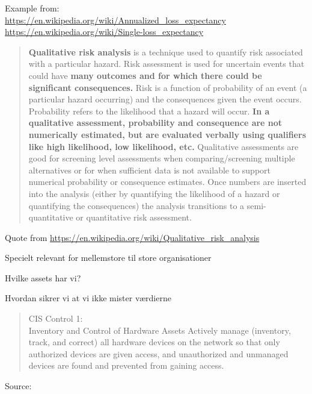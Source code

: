 \documentclass[Screen16to9,17pt]{foils}
\begin{document}
Example from:\\
\url{https://en.wikipedia.org/wiki/Annualized_loss_expectancy}\\
\url{https://en.wikipedia.org/wiki/Single-loss_expectancy}


\begin{quote}
  {\bf Qualitative risk analysis} is a technique used to quantify risk associated with a particular hazard. Risk assessment is used for uncertain events that could have {\bf many outcomes and for which there could be significant consequences.} Risk is a function of probability of an event (a particular hazard occurring) and the consequences given the event occurs. Probability refers to the likelihood that a hazard will occur. {\bf In a qualitative assessment, probability and consequence are not numerically estimated, but are evaluated verbally using qualifiers like high likelihood, low likelihood, etc.} Qualitative assessments are good for screening level assessments when comparing/screening multiple alternatives or for when sufficient data is not available to support numerical probability or consequence estimates. Once numbers are inserted into the analysis (either by quantifying the likelihood of a hazard or quantifying the consequences) the analysis transitions to a semi-quantitative or quantitative risk assessment.
\end{quote}

Quote from \url{https://en.wikipedia.org/wiki/Qualitative_risk_analysis}






\begin{list2}
\item Specielt relevant for mellemstore til store organisationer
\item Hvilke assets har vi?
\item Hvordan sikrer vi at vi ikke mister værdierne
\end{list2}



\begin{quote}
CIS Control 1:\\
Inventory and Control of Hardware Assets
Actively manage (inventory, track, and correct) all hardware devices on the network so that only
authorized devices are given access, and unauthorized and unmanaged devices are found and
prevented from gaining access.
\end{quote}
Source: 
\end{document}
